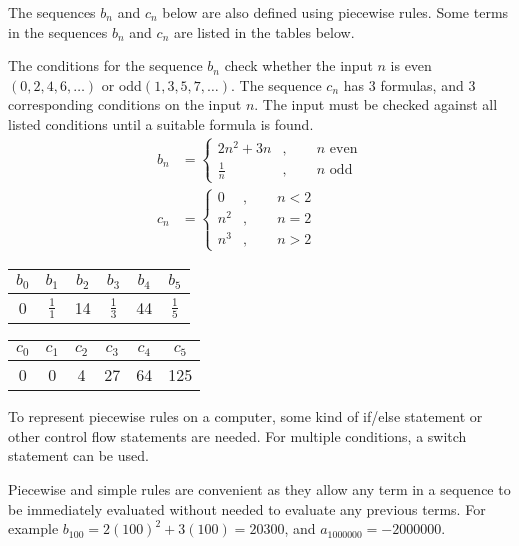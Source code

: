 \documentclass[11pt,a4paper,titlepage,oneside,openany]{article}
\begin{document}
The sequences $b_n$ and $c_n$ below are also defined using piecewise rules. Some terms in the sequences $b_n$ and $c_n$ are listed in the tables below.

The conditions for the sequence $b_n$ check whether the input $n$ is even$(0,2,4,6,\ldots)$ or odd$(1,3,5,7,\ldots)$. The sequence $c_n$ has $3$ formulas, and $3$ corresponding conditions on the input $n$. The input must be checked against all listed conditions until a suitable formula is found.
\begin{align*}
  b_n&= \begin{cases}
    2n^2+3n&,\qquad n \text{ even}\\
    \frac{1}{n} &,\qquad n \text{ odd}
  \end{cases}\\
  c_n&= \begin{cases}
    0 &,\qquad n<2\\
    n^2 &,\qquad n=2\\
    n^3 &,\qquad n>2
  \end{cases}
\end{align*}


\begin{center}
\begin{tabular}{|c|c|c|c|c|c|}
\hline
$b_0$ & $b_1$ & $b_2$ & $b_3$ & $b_4$ & $b_5$ \\
\hline
  0 & $\frac{1}{1}$ & 14 & $\frac{1}{3}$ & 44 & $\frac{1}{5}$ \\
\hline
\end{tabular}
\end{center}

\begin{center}
\begin{tabular}{|c|c|c|c|c|c|}
\hline
$c_0$ & $c_1$ & $c_2$ & $c_3$ & $c_4$ & $c_5$ \\
\hline
  0 & 0 & 4 & 27 & 64 & 125  \\
\hline
\end{tabular}
\end{center}

To represent piecewise rules on a computer, some kind of if/else statement or other control flow statements are needed. For multiple conditions, a switch statement can be used.

Piecewise and simple rules are convenient as they allow any term in a sequence to be immediately evaluated without needed to evaluate any previous terms. For example $b_{100}=2(100)^2+3(100)=20300$, and $a_{1000000} = -2000000$.
\end{document}
